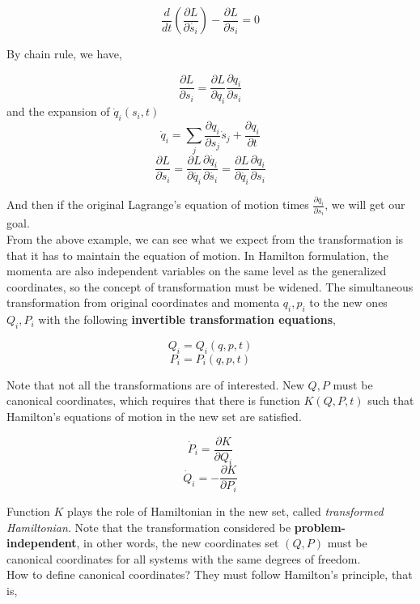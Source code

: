 \documentclass[12pt]{article}
\begin{document}
\begin{center}
    \[ \frac{d}{dt} \left( \frac{\partial L}{\partial \dot{s_i}} \right) - \frac{\partial L}{\partial s_i} = 0 \]
\end{center}

By chain rule, we have,

\begin{center}
    \[ \frac{\partial L}{\partial s_i} = \frac{\partial L}{\partial q_i}\frac{\partial q_i}{\partial s_i} \]
    and the expansion of $\dot{q}_i(s_i, t)$
    \[ \dot{q}_i = \sum_{j}{\frac{\partial q_i}{\partial s_j} \dot{s}_j} + \frac{\partial q_i}{\partial t} \]
    \[ \frac{\partial L}{\partial \dot{s}_i} = \frac{\partial L}{\partial \dot{q_i}} \frac{\partial \dot{q_i}}{\partial \dot{s_i}} = \frac{\partial L}{\partial \dot{q_i}} \frac{\partial q_i}{\partial s_i} \]
\end{center}

And then if the original Lagrange's equation of motion times $\frac{\partial q_i}{\partial s_i}$, we will get our goal.
\\
From the above example, we can see what we expect from the transformation is that it has to maintain the equation of motion. In Hamilton formulation, the momenta are also independent variables on the same level as the generalized coordinates, so the concept of transformation must be widened. The simultaneous transformation from original coordinates and momenta $q_i, p_i$ to the new ones $Q_i, P_i$ with the following \textbf{invertible transformation equations},

\begin{center}
    \[ Q_i = Q_i(q, p, t) \]
    \[ P_i = P_i(q, p, t) \]
\end{center}

Note that not all the transformations are of interested. New $Q, P$ must be canonical coordinates, which requires that there is function $K(Q, P, t)$ such that Hamilton's equations of motion in the new set are satisfied.

\begin{center}
    \[ \dot{P}_i = \frac{\partial K}{\partial Q_i} \]
    \[ \dot{Q}_i = - \frac{\partial K}{\partial P_i} \]
\end{center}

Function $K$ plays the role of Hamiltonian in the new set, called \textit{transformed Hamiltonian}. Note that the transformation considered be \textbf{problem-independent}, in other words, the new coordinates set $(Q,P)$ must be canonical coordinates for all systems with the same degrees of freedom.
\\
How to define canonical coordinates? They must follow Hamilton's principle, that is,
\end{document}
